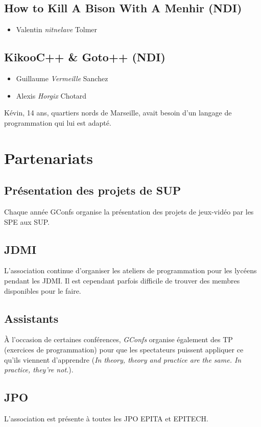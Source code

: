 \documentclass[a4paper]{article}
\begin{document}
\vspace{0.3cm}

\subsection{How to Kill A Bison With A Menhir (NDI)}
\begin{itemize}
    \item Valentin \emph{nitnelave} Tolmer
\end{itemize}

\vspace{0.3cm}

\subsection{KikooC++ \& Goto++ (NDI)}
\begin{itemize}
    \item Guillaume \emph{Vermeille} Sanchez
    \item Alexis \emph{Horgix} Chotard
\end{itemize}

Kévin, 14 ans, quartiers nords de Marseille, avait besoin d'un langage de
programmation qui lui est adapté.

\vspace{0.3cm}

\section{Partenariats}

\subsection{Présentation des projets de SUP}

Chaque année GConfs organise la présentation des projets de jeux-vidéo par les
SPE aux SUP.

\subsection{JDMI}

L'association continue d'organiser les ateliers de programmation pour les
lycéens pendant les JDMI. Il est cependant parfois difficile de trouver des
membres disponibles pour le faire.

\subsection{Assistants}

À l'occasion de certaines conférences, \emph{GConfs} organise également des TP
(exercices de programmation) pour que les spectateurs puissent appliquer ce
qu'ils viennent d'apprendre (\emph{In theory, theory and practice are the same.
In practice, they’re not.}).

\subsection{JPO}

L'association est présente à toutes les JPO EPITA et EPITECH.


\end{document}
